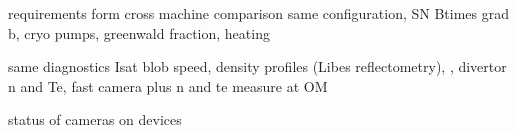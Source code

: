 \documentclass[10pt, compress, draft]{beamer}
\begin{document}
\begin{frame}{requirements form cross machine comparison }
same configuration, SN Btimes grad b, cryo pumps, greenwald fraction, heating 

same diagnostics Isat blob speed, density profiles (Libes reflectometry), , divertor n and Te, fast camera plus n and te measure at OM

status of cameras on devices


\end{frame}
\end{document}
